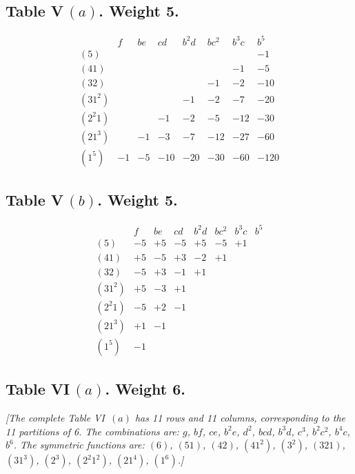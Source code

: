 \documentclass[11pt,a4paper]{book}
\begin{document}
\begin{center}
\subsection*{Table V\,$(a)$. Weight 5.}
\[
\begin{array}{c|ccccccc}
& f & be & cd & b^2 d & bc^2 & b^3 c & b^5 \\ \hline
(5) & & & & & & & -1 \\
(41) & & & & & & -1 & -5 \\
(32) & & & & & -1 & -2 & -10 \\
(31^2) & & & & -1 & -2 & -7 & -20 \\
(2^2 1) & & & -1 & -2 & -5 & -12 & -30 \\
(21^3) & & -1 & -3 & -7 & -12 & -27 & -60 \\
(1^5) & -1 & -5 & -10 & -20 & -30 & -60 & -120
\end{array}
\]

\subsection*{Table V\,$(b)$. Weight 5.}
\[
\begin{array}{c|ccccccc}
& f & be & cd & b^2 d & bc^2 & b^3 c & b^5 \\ \hline
(5) & -5 & +5 & -5 & +5 & -5 & +1 \\
(41) & +5 & -5 & +3 & -2 & +1 \\
(32) & -5 & +3 & -1 & +1 \\
(31^2) & +5 & -3 & +1 \\
(2^2 1) & -5 & +2 & -1 \\
(21^3) & +1 & -1 \\
(1^5) & -1
\end{array}
\]

\newpage
\subsection*{Table VI\,$(a)$. Weight 6.}

\textit{[The complete Table VI~$(a)$ has 11 rows and 11 columns, corresponding
to the 11 partitions of 6. The combinations are: $g$, $bf$, $ce$, $b^2 e$,
$d^2$, $bcd$, $b^3 d$, $c^3$, $b^2 c^2$, $b^4 c$, $b^6$. The symmetric
functions are: $(6)$, $(51)$, $(42)$, $(41^2)$, $(3^2)$, $(321)$, $(31^3)$,
$(2^3)$, $(2^2 1^2)$, $(21^4)$, $(1^6)$.]}


\end{center}
\end{document}
